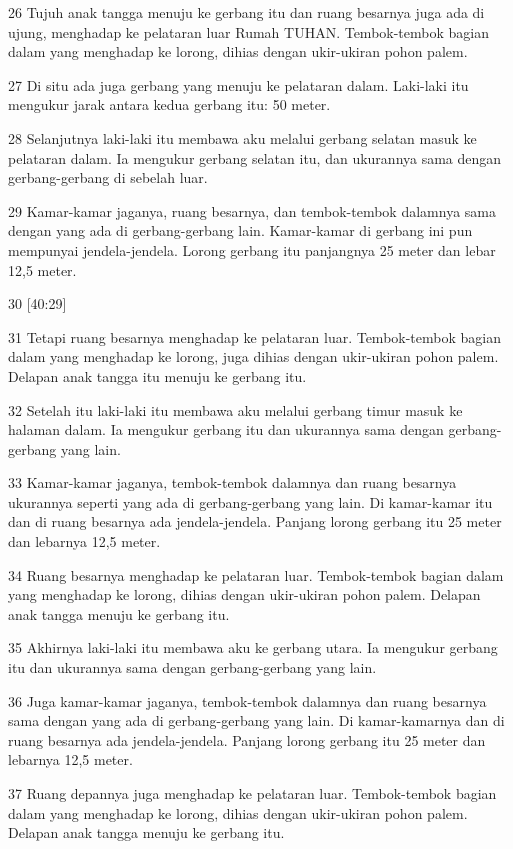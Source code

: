 \par 26 Tujuh anak tangga menuju ke gerbang itu dan ruang besarnya juga ada di ujung, menghadap ke pelataran luar Rumah TUHAN. Tembok-tembok bagian dalam yang menghadap ke lorong, dihias dengan ukir-ukiran pohon palem.
\par 27 Di situ ada juga gerbang yang menuju ke pelataran dalam. Laki-laki itu mengukur jarak antara kedua gerbang itu: 50 meter.
\par 28 Selanjutnya laki-laki itu membawa aku melalui gerbang selatan masuk ke pelataran dalam. Ia mengukur gerbang selatan itu, dan ukurannya sama dengan gerbang-gerbang di sebelah luar.
\par 29 Kamar-kamar jaganya, ruang besarnya, dan tembok-tembok dalamnya sama dengan yang ada di gerbang-gerbang lain. Kamar-kamar di gerbang ini pun mempunyai jendela-jendela. Lorong gerbang itu panjangnya 25 meter dan lebar 12,5 meter.
\par 30 [40:29]
\par 31 Tetapi ruang besarnya menghadap ke pelataran luar. Tembok-tembok bagian dalam yang menghadap ke lorong, juga dihias dengan ukir-ukiran pohon palem. Delapan anak tangga itu menuju ke gerbang itu.
\par 32 Setelah itu laki-laki itu membawa aku melalui gerbang timur masuk ke halaman dalam. Ia mengukur gerbang itu dan ukurannya sama dengan gerbang-gerbang yang lain.
\par 33 Kamar-kamar jaganya, tembok-tembok dalamnya dan ruang besarnya ukurannya seperti yang ada di gerbang-gerbang yang lain. Di kamar-kamar itu dan di ruang besarnya ada jendela-jendela. Panjang lorong gerbang itu 25 meter dan lebarnya 12,5 meter.
\par 34 Ruang besarnya menghadap ke pelataran luar. Tembok-tembok bagian dalam yang menghadap ke lorong, dihias dengan ukir-ukiran pohon palem. Delapan anak tangga menuju ke gerbang itu.
\par 35 Akhirnya laki-laki itu membawa aku ke gerbang utara. Ia mengukur gerbang itu dan ukurannya sama dengan gerbang-gerbang yang lain.
\par 36 Juga kamar-kamar jaganya, tembok-tembok dalamnya dan ruang besarnya sama dengan yang ada di gerbang-gerbang yang lain. Di kamar-kamarnya dan di ruang besarnya ada jendela-jendela. Panjang lorong gerbang itu 25 meter dan lebarnya 12,5 meter.
\par 37 Ruang depannya juga menghadap ke pelataran luar. Tembok-tembok bagian dalam yang menghadap ke lorong, dihias dengan ukir-ukiran pohon palem. Delapan anak tangga menuju ke gerbang itu.
